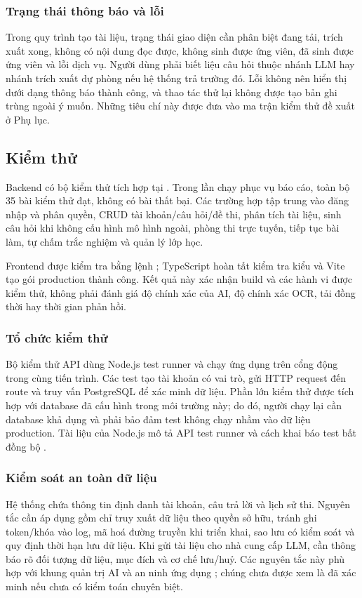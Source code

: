 \subsubsection{Trạng thái thông báo và lỗi}
Trong quy trình tạo tài liệu, trạng thái giao diện cần phân biệt đang tải,
trích xuất xong, không có nội dung đọc được, không sinh được ứng viên, đã
sinh được ứng viên và lỗi dịch vụ. Người dùng phải biết liệu câu hỏi thuộc
nhánh LLM hay nhánh trích xuất dự phòng nếu hệ thống trả trường đó. Lỗi
không nên hiển thị dưới dạng thông báo thành công, và thao tác thử lại
không được tạo bản ghi trùng ngoài ý muốn. Những tiêu chí này được đưa vào
ma trận kiểm thử đề xuất ở Phụ lục.

\subsection{Kiểm thử}

Backend có bộ kiểm thử tích hợp tại .
Trong lần chạy phục vụ báo cáo, toàn bộ 35 bài kiểm thử đạt, không có bài
thất bại. Các trường hợp tập trung vào đăng nhập và phân quyền, CRUD tài
khoản/câu hỏi/đề thi, phân tích tài liệu, sinh câu hỏi khi không cấu hình
mô hình ngoài, phòng thi trực tuyến, tiếp tục bài làm, tự chấm trắc nghiệm
và quản lý lớp học.

Frontend được kiểm tra bằng lệnh ; TypeScript hoàn tất
kiểm tra kiểu và Vite tạo gói production thành công. Kết quả này xác nhận
build và các hành vi được kiểm thử, không phải đánh giá độ chính xác của AI,
độ chính xác OCR, tải đồng thời hay thời gian phản hồi.

\subsubsection{Tổ chức kiểm thử}
Bộ kiểm thử API dùng Node.js test runner và chạy ứng dụng trên cổng động
trong cùng tiến trình. Các test tạo tài khoản có vai trò, gửi HTTP request
đến route và truy vấn PostgreSQL để xác minh dữ liệu. Phần lớn kiểm thử
được tích hợp với database đã cấu hình trong môi trường này; do đó, người
chạy lại cần database khả dụng và phải bảo đảm test không chạy nhầm vào
dữ liệu production. Tài liệu của Node.js mô tả API test runner và cách
khai báo test bất đồng bộ \cite{NodeTestDocs}.

\subsubsection{Kiểm soát an toàn dữ liệu}
Hệ thống chứa thông tin định danh tài khoản, câu trả lời và lịch sử thi.
Nguyên tắc cần áp dụng gồm chỉ truy xuất dữ liệu theo quyền sở hữu, tránh
ghi token/khóa vào log, mã hoá đường truyền khi triển khai, sao lưu có kiểm
soát và quy định thời hạn lưu dữ liệu. Khi gửi tài liệu cho nhà cung cấp
LLM, cần thông báo rõ đối tượng dữ liệu, mục đích và cơ chế lưu/huỷ. Các
nguyên tắc này phù hợp với khung quản trị AI và an ninh ứng dụng
\cite{NISTAIRMF,OWASPTop10,OWASPAPI,OWASPLLM}; chúng chưa được xem là đã xác
minh nếu chưa có kiểm toán chuyên biệt.
